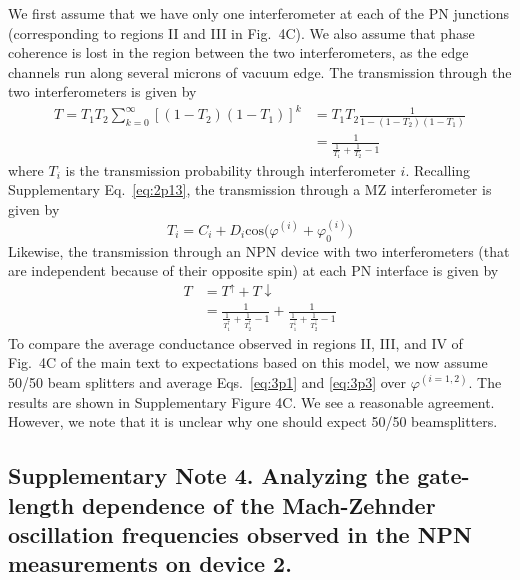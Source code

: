\documentclass[%
reprint,amsmath,amssymb,aps,prl,superscriptaddress,
twocolumn
]{revtex4-1}
\begin{document}
		We first assume that we have only one interferometer at each of the PN junctions (corresponding to regions II and III in Fig.~4C). We also assume that phase coherence is lost in the region between the two interferometers, as the edge channels run along several microns of vacuum edge. The transmission through the two interferometers is given by
		\begin{equation}
		\begin{split}
		T = T_1 T_2 \sum ^\infty_{k=0} [(1-T_2)(1-T_1)]^k & = T_1T_2 \frac{1}{1-(1-T_2)(1-T_1)} \\
		& = \frac{1}{\frac{1}{T_1} + \frac{1}{T_2}-1}
		\end{split}
		\label{eq:3p1}
		\end{equation}
		where $T_i$ is the transmission probability through interferometer $i$. Recalling Supplementary Eq.~\ref{eq:2p13}, the transmission through a MZ interferometer is given by
		\begin{equation}
		T_i = C_i +D_i \mathrm{cos} \Big( \varphi^{(i)} + \varphi_0^{(i)} \Big) 
		\end{equation}
		Likewise, the transmission through an NPN device with two interferometers (that are independent because of their opposite spin) at each PN interface is given by
		\begin{equation}
		\begin{split}
		T& = T^{\uparrow} +T{\downarrow} \\
		& = \frac{1}{\frac{1}{T_1^{\uparrow}} + \frac{1}{T_2^\uparrow}-1}
		+ \frac{1}{\frac{1}{T_1^{\downarrow}} + \frac{1}{T_2^\downarrow}-1}
		\end{split}
		\label{eq:3p3}
		\end{equation}
		To compare the average conductance observed in regions II, III, and IV of Fig.~4C of the main text to expectations based on this model, we now assume 50/50 beam splitters and average Eqs.~\ref{eq:3p1} and \ref{eq:3p3} over $\varphi^{(i=1,2)}$. The results are shown in Supplementary Figure 4C. We see a reasonable agreement. However, we note that it is unclear why one should expect 50/50 beamsplitters. 
		
		
		\subsection{Supplementary Note 4. Analyzing the gate-length dependence of the Mach-Zehnder oscillation frequencies observed in the NPN measurements on device 2.}
		
\end{document}

